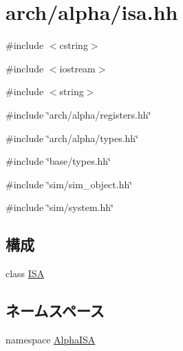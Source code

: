 \hypertarget{alpha_2isa_8hh}{
\section{arch/alpha/isa.hh}
\label{alpha_2isa_8hh}
}
{\ttfamily \#include $<$cstring$>$}\par
{\ttfamily \#include $<$iostream$>$}\par
{\ttfamily \#include $<$string$>$}\par
{\ttfamily \#include \char`\"{}arch/alpha/registers.hh\char`\"{}}\par
{\ttfamily \#include \char`\"{}arch/alpha/types.hh\char`\"{}}\par
{\ttfamily \#include \char`\"{}base/types.hh\char`\"{}}\par
{\ttfamily \#include \char`\"{}sim/sim\_\-object.hh\char`\"{}}\par
{\ttfamily \#include \char`\"{}sim/system.hh\char`\"{}}\par
\subsection*{構成}
\begin{DoxyCompactItemize}
\item 
class \hyperlink{classAlphaISA_1_1ISA}{ISA}
\end{DoxyCompactItemize}
\subsection*{ネームスペース}
\begin{DoxyCompactItemize}
\item 
namespace \hyperlink{namespaceAlphaISA}{AlphaISA}
\end{DoxyCompactItemize}
